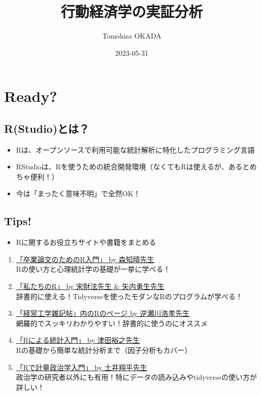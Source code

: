\documentclass[
]{book}
\title{行動経済学の実証分析}
\author{Tomohisa OKADA}
\date{2023-05-31}
\providecommand{\tightlist}{%
  \setlength{\itemsep}{0pt}\setlength{\parskip}{0pt}}
\begin{document}
\maketitle

{
\setcounter{tocdepth}{1}
\tableofcontents
}
\hypertarget{ready}{%
\chapter{Ready?}\label{ready}}

\hypertarget{rstudioux3068ux306f}{%
\section{R(Studio)とは？}\label{rstudioux3068ux306f}}

\begin{itemize}
\tightlist
\item
  Rは、オープンソースで利用可能な統計解析に特化したプログラミング言語
\item
  RStudioは、Rを使うための統合開発環境（なくてもRは使えるが、あるとめちゃ便利！）\\
\item
  今は「まったく意味不明」で全然OK！
\end{itemize}

\hypertarget{tips}{%
\section{Tips!}\label{tips}}

\begin{itemize}
\tightlist
\item
  Rに関するお役立ちサイトや書籍をまとめる
\end{itemize}

\begin{enumerate}
\def\labelenumi{\arabic{enumi}.}
\item
  \href{https://tomoecon.github.io/R_for_graduate_thesis/}{「卒業論文のためのR入門」 by 森知晴先生}\\
  Rの使い方と心理統計学の基礎が一挙に学べる！
\item
  \href{https://www.jaysong.net/RBook/datahandling1.html}{「私たちのR」 by 宋財泫先生 \& 矢内勇生先生}\\
  辞書的に使える！Tidyverseを使ったモダンなRのプログラムが学べる！
\item
  \href{http://www.f.waseda.jp/sakas/R/index.html}{「経営工学雑記帖」内のRのページ by 逆瀬川浩孝先生}\\
  網羅的でスッキリわかりやすい！辞書的に使うのにオススメ
\item
  \href{https://htsuda.net/stats/}{「Rによる統計入門」 by 津田裕之先生}\\
  Rの基礎から簡単な統計分析まで（因子分析もカバー）
\item
  \href{https://shohei-doi.github.io/quant_polisci/index.html}{「Rで計量政治学入門」 by 土井翔平先生}\\
  政治学の研究者以外にも有用！特にデータの読み込みやtidyverseの使い方が詳しい！
\end{enumerate}
\end{document}
